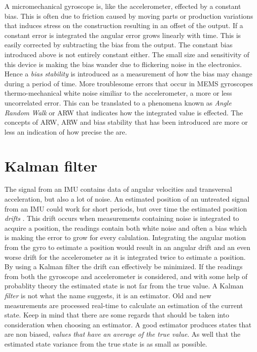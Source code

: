 \documentclass[a4paper,11pt]{kth-mag}
\begin{document}
A micromechanical gyroscope is, like the accelerometer, effected by a constant bias. This is often due to friction caused by moving parts or production variations that induces stress on the construction resulting in an offset of the output. If a constant error is integrated the angular error grows linearly with time. This is easily corrected by subtracting the bias from the output.
The constant bias introduced above is not entirely constant either. The small size and sensitivity of this device is making the bias wander due to flickering noise in the electronics. Hence a \textit{bias stability} is introduced as a measurement of how the bias may change during a period of time.
More troublesome errors that occur in MEMS gyroscopes thermo-mechanical white noise similiar to the accelerometer, a more or less uncorrelated error. This can be translated to a phenomena known as \textit{Angle Random Walk} or ARW that indicates how the integrated value is effected.
The concepts of ARW, ARW and bias stability that has been introduced are more or less an indication of how precise the  are. \cite{IMUintro}  

\section{Kalman filter}
The signal from an IMU contains data of angular velocities and transversal acceleration, but also a lot of noise. An estimated position of an untreated signal from an IMU could work for short periods, but over time the estimated position \textit{drifts} \cite{MEMSdrift}. This drift occurs when measurements containing noise is integrated to acquire a position, the readings contain both white noise and often a bias which is making the  error to grow for every calulation.
Integrating the angular motion from the gyro to estimate a position would result in an angular drift and an even worse drift for the accelerometer as it is integrated twice to estimate a position.
By using a Kalman filter the drift can effectively be minimized. If the readings from both the gyroscope and accelerometer is considered, and with some help of probablity theory the estimated state is not far from the true value.  A Kalman \textit{filter} is not what the name suggests, it is an estimator. Old and new measurements are processed real-time to calculate an estimation of the current state.
Keep in mind that there are some regards that should be taken into consideration when choosing an estimator.
A good estimator produces states that are non biased, \emph{values that have an average  of the true value}. As well that the estimated state variance from the true state is as small as possible.\cite{Simon2001}
\end{document}
